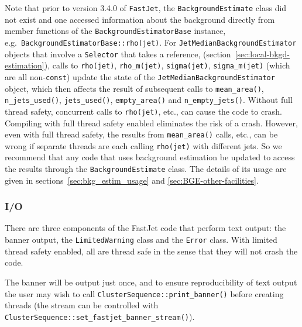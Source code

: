 \documentclass[12pt,a4]{article}
\newcommand{\fastjet}{\texttt{FastJet}\xspace}
\newcommand{\ttt}[1]{{\small\texttt{#1}}}
\begin{document}
Note that prior to version 3.4.0 of \fastjet, the
\ttt{BackgroundEstimate} class did not exist and one accessed
information about the background directly from member functions of the
\ttt{BackgroundEstimatorBase} instance, e.g.\
\ttt{BackgroundEstimatorBase::rho(jet)}.
%
%
For \ttt{JetMedianBackgroundEstimator} objects that involve a
\ttt{Selector} that takes a reference,
(section~\ref{sec:local-bkgd-estimation}),
%
calls to \ttt{rho(jet)}, \ttt{rho\_m(jet)}, \ttt{sigma(jet)},
\ttt{sigma\_m(jet)} (which are all non-\ttt{const}) update the state
of the \ttt{JetMedianBackgroundEstimator} object, which then affects
the result of subsequent calls to \ttt{mean\_area()},
\ttt{n\_jets\_used()}, \ttt{jets\_used()}, \ttt{empty\_area()} and
\ttt{n\_empty\_jets()}.
%
Without full thread safety, concurrent calls to \ttt{rho(jet)}, etc.,
can cause the code to crash.
%
Compiling with full thread safety enabled eliminates the risk of a
crash. 
%
However, even with full thread safety, the results from
\ttt{mean\_area()} calls, etc., can be wrong if separate threads are
each calling \ttt{rho(jet)} with different jets.
%
So we recommend that any code that uses background estimation be
updated to access the results through the \ttt{BackgroundEstimate}
class.
%
The details of its usage are given in
sections~\ref{sec:bkg_estim_usage} and
\ref{sec:BGE-other-facilities}. 

\subsubsection{I/O}
\label{sec:thread-safe-io}

There are three components of the FastJet code that perform text
output: the banner output, the \ttt{LimitedWarning} class and the
\ttt{Error} class.
%
With limited thread safety enabled, all are thread safe in the sense
that they will not crash the code.

The banner will be output just once, and to ensure reproducibility of
text output the user may wish to call
\ttt{ClusterSequence::print\_banner()} before creating threads (the
stream can be controlled with
\ttt{ClusterSequence::set\_fastjet\_banner\_stream()}).
%
\end{document}
